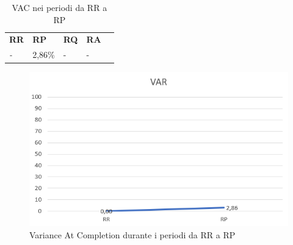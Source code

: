 \renewcommand{\arraystretch}{1.5}
\begin{longtable}{ C{3cm} C{3cm}  C{3cm}  C{3cm} c }
    \caption{ VAC nei periodi da RR a RP} \\
    \rowcolor{\primaryColor}
    \textcolor{\secondaryColor}{
    \centering\textbf{RR}}     & \textcolor{\secondaryColor}{\centering\textbf{RP}}    & \textcolor{\secondaryColor}
    {\centering\textbf{RQ}} & \textcolor{\secondaryColor}{\centering\textbf{RA}}    \\
    \textit{-}           & 2,86\%                                 & - & - \\
\end{longtable}


\begin{figure}[H]
	\centering
	\includegraphics[scale=0.8]{src/ResocontoVerifica/src/img/VAC.png}
	\caption{Variance At Completion durante i periodi da RR a RP}
\end{figure}